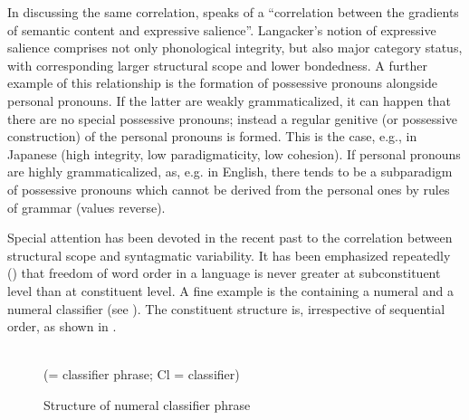 In discussing the same correlation, \citet[112f]{Langacker1977} speaks of a “correlation between the gradients of semantic content and expressive salience”. Langacker's notion of expressive salience comprises not only phonological integrity, but also major category status, with corresponding larger structural scope and lower bondedness. A further example of this relationship is the formation of possessive pronouns alongside personal pronouns. If the latter are weakly grammaticalized, it can happen that there are no special possessive pronouns; instead a regular genitive (or possessive construction) of the personal pronouns is formed. This is the case, e.g., in Japanese (high integrity, low paradigmaticity, low cohesion). If personal pronouns are highly grammaticalized, as, e.g. in English, there tends to be a subparadigm of possessive pronouns which cannot be derived from the personal ones by rules of grammar (values reverse).

\enlargethispage{1\baselineskip}
Special attention has been devoted in the recent past to the correlation between structural scope and syntagmatic variability. It has been emphasized repeatedly (\citealt[205--209]{Givón1979a}) that freedom of word order in a language is never greater at subconstituent level than at constituent level. A fine example is the \np containing a numeral and a numeral classifier (see \citealt[29]{Greenberg1975}). The constituent structure is, irrespective of sequential order, as shown in .

\begin{figure}
	\\
	(\lspcp = classifier phrase; Cl = classifier)
	\caption{Structure of numeral classifier phrase}\label{F11}
\end{figure}

